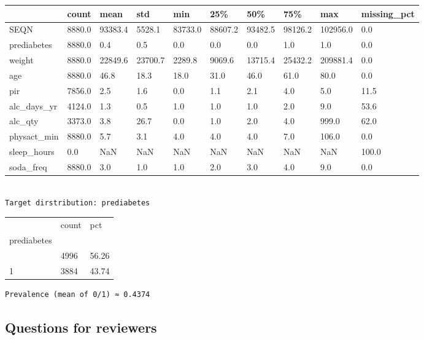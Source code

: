 \documentclass[
  letterpaper,
  DIV=11,
  numbers=noendperiod]{scrartcl}
\begin{document}
\begin{longtable}[]{@{}llllllllll@{}}
\toprule\noalign{}
& count & mean & std & min & 25\% & 50\% & 75\% & max & missing\_pct \\
\midrule\noalign{}
\endhead
\bottomrule\noalign{}
\endlastfoot
SEQN & 8880.0 & 93383.4 & 5528.1 & 83733.0 & 88607.2 & 93482.5 & 98126.2
& 102956.0 & 0.0 \\
prediabetes & 8880.0 & 0.4 & 0.5 & 0.0 & 0.0 & 0.0 & 1.0 & 1.0 & 0.0 \\
weight & 8880.0 & 22849.6 & 23700.7 & 2289.8 & 9069.6 & 13715.4 &
25432.2 & 209881.4 & 0.0 \\
age & 8880.0 & 46.8 & 18.3 & 18.0 & 31.0 & 46.0 & 61.0 & 80.0 & 0.0 \\
pir & 7856.0 & 2.5 & 1.6 & 0.0 & 1.1 & 2.1 & 4.0 & 5.0 & 11.5 \\
alc\_days\_yr & 4124.0 & 1.3 & 0.5 & 1.0 & 1.0 & 1.0 & 2.0 & 9.0 &
53.6 \\
alc\_qty & 3373.0 & 3.8 & 26.7 & 0.0 & 1.0 & 2.0 & 4.0 & 999.0 & 62.0 \\
physact\_min & 8880.0 & 5.7 & 3.1 & 4.0 & 4.0 & 4.0 & 7.0 & 106.0 &
0.0 \\
sleep\_hours & 0.0 & NaN & NaN & NaN & NaN & NaN & NaN & NaN & 100.0 \\
soda\_freq & 8880.0 & 3.0 & 1.0 & 1.0 & 2.0 & 3.0 & 4.0 & 9.0 & 0.0 \\
\end{longtable}

\begin{verbatim}

Target dirstribution: prediabetes 
\end{verbatim}

\begin{longtable}[]{@{}lll@{}}
\toprule\noalign{}
& count & pct \\
prediabetes & & \\
\midrule\noalign{}
\endhead
\bottomrule\noalign{}
\endlastfoot
0 & 4996 & 56.26 \\
1 & 3884 & 43.74 \\
\end{longtable}

\begin{verbatim}
Prevalence (mean of 0/1) ≈ 0.4374
\end{verbatim}

\subsection{Questions for reviewers}\label{questions-for-reviewers-2}
\end{document}
